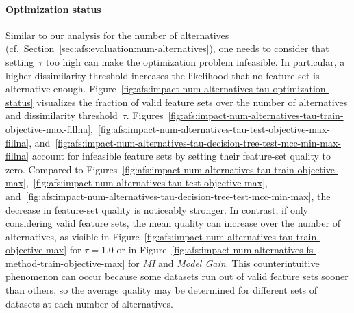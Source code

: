 \documentclass{article}
\theoremstyle{definition}
\begin{document}
\paragraph{Optimization status}

Similar to our analysis for the number of alternatives (cf.~Section~\ref{sec:afs:evaluation:num-alternatives}), one needs to consider that setting~$\tau$ too high can make the optimization problem infeasible.
In particular, a higher dissimilarity threshold increases the likelihood that no feature set is alternative enough.
Figure~\ref{fig:afs:impact-num-alternatives-tau-optimization-status} visualizes the fraction of valid feature sets over the number of alternatives and dissimilarity threshold~$\tau$.
Figures~\ref{fig:afs:impact-num-alternatives-tau-train-objective-max-fillna},~\ref{fig:afs:impact-num-alternatives-tau-test-objective-max-fillna}, and~\ref{fig:afs:impact-num-alternatives-tau-decision-tree-test-mcc-min-max-fillna} account for infeasible feature sets by setting their feature-set quality to zero.
Compared to Figures~\ref{fig:afs:impact-num-alternatives-tau-train-objective-max},~\ref{fig:afs:impact-num-alternatives-tau-test-objective-max}, and~\ref{fig:afs:impact-num-alternatives-tau-decision-tree-test-mcc-min-max}, the decrease in feature-set quality is noticeably stronger.
In contrast, if only considering valid feature sets, the mean quality can increase over the number of alternatives, as visible in Figure~\ref{fig:afs:impact-num-alternatives-tau-train-objective-max} for $\tau=1.0$ or in Figure~\ref{fig:afs:impact-num-alternatives-fs-method-train-objective-max} for \emph{MI} and \emph{Model Gain}.
This counterintuitive phenomenon can occur because some datasets run out of valid feature sets sooner than others, so the average quality may be determined for different sets of datasets at each number of alternatives.
\end{document}
